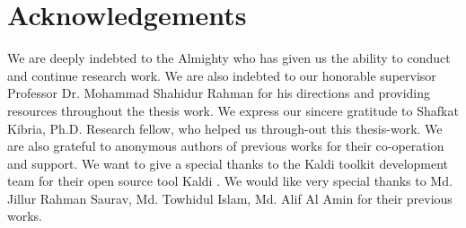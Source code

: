\documentclass{standalone}
\begin{document}
\chapter*{Acknowledgements}
We are deeply indebted to the Almighty who has given us the ability to conduct and
continue research work.
We are also indebted to our honorable supervisor Professor Dr. Mohammad Shahidur
Rahman for his directions and providing resources throughout the thesis work.
We express our sincere gratitude to Shafkat Kibria, Ph.D. Research fellow, who helped
us through-out this thesis-work.
We are also grateful to anonymous authors of previous works for their co-operation and
support.
We want to give a special thanks to the Kaldi toolkit development team for their open
source tool Kaldi \cite{povey2011kaldi}.
We would like very special thanks to Md. Jillur Rahman Saurav, Md. Towhidul Islam, Md. Alif Al Amin for their previous works.
\end{document}
